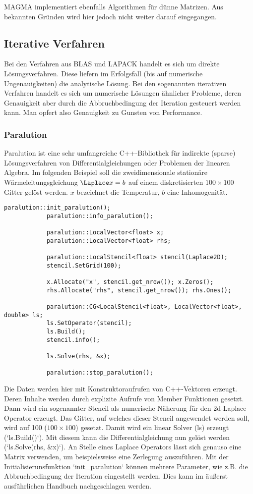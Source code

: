 		MAGMA implementiert ebenfalls Algorithmen für dünne Matrizen. Aus bekannten Gründen wird hier jedoch nicht weiter darauf eingegangen.
		
		\subsection{Iterative Verfahren}
		Bei den Verfahren aus BLAS und LAPACK handelt es sich um direkte Lösungsverfahren. Diese liefern im Erfolgsfall (bis auf numerische Ungenauigkeiten) die analytische Lösung. Bei den sogenannten iterativen Verfahren handelt es sich um numerische Lösungen ähnlicher Probleme, deren Genauigkeit aber durch die Abbruchbedingung der Iteration gesteuert werden kann. Man opfert also Genauigkeit zu Gunsten von Performance. 
		
			\subsubsection{Paralution}
			Paralution ist eine sehr umfangreiche C++-Bibliothek für indirekte (sparse) Lösungsverfahren von Differentialgleichungen oder Problemen der linearen Algebra. Im folgenden Beispiel soll die zweidimensionale stationäre Wärmeleitungsgleichung $\Laplace x = b$ auf einem diskretisierten $100\times 100$ Gitter gelöst werden. $x$ bezeichnet die Temperatur, $b$ eine Inhomogenität.
			\begin{lstlisting}[caption=Paralution Beispiel]		
			paralution::init_paralution();
			paralution::info_paralution();

			paralution::LocalVector<float> x;
			paralution::LocalVector<float> rhs;

			paralution::LocalStencil<float> stencil(Laplace2D);
			stencil.SetGrid(100);

			x.Allocate("x", stencil.get_nrow()); x.Zeros();
			rhs.Allocate("rhs", stencil.get_nrow()); rhs.Ones();

			paralution::CG<LocalStencil<float>, LocalVector<float>, double> ls;
			ls.SetOperator(stencil);
			ls.Build();
			stencil.info();

			ls.Solve(rhs, &x);

			paralution::stop_paralution();
			\end{lstlisting}
			
			Die Daten werden hier mit Konstruktoraufrufen von C++-Vektoren erzeugt. Deren Inhalte werden durch explizite Aufrufe von Member Funktionen gesetzt. Dann wird ein sogenannter Stencil als numerische Näherung für den 2d-Laplace Operator erzeugt. Das Gitter, auf welches dieser Stencil angewendet werden soll, wird auf 100 ($100\times 100$) gesetzt. Damit wird ein linear Solver (ls) erzeugt (\li`ls.Build()`). Mit diesem kann die Differentialgleichung nun gelöst werden (\li`ls.Solve(rhs, &x)`). An Stelle eines Laplace Operators lässt sich genauso eine Matrix verwenden, um beispielsweise eine Zerlegung auszuführen. Mit der Initialisierunsfunktion \li`init_paralution` können mehrere Parameter, wie z.B. die Abbruchbedingung der Iteration eingestellt werden. Dies kann im äußerst ausführlichen Handbuch nachgeschlagen werden. \autocite{para}
			 
